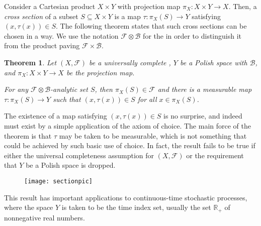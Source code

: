 \documentclass[12pt]{article}
\newtheorem*{theorem*}{Theorem}
\begin{document}

Consider a Cartesian product $X\times Y$ with projection map $\pi_X\colon X\times Y\to X$. Then, a \emph{cross section} of a subset $S\subseteq X\times Y$ is a map $\tau\colon\pi_X(S)\to Y$ satisfying $(x,\tau(x))\in S$.
The following theorem states that such cross sections can be chosen in a  way. We use the notation $\mathcal{F}\otimes\mathcal{B}$ for the  in order to distinguish it from the product paving $\mathcal{F}\times\mathcal{B}$.

\begin{theorem*}
Let $(X,\mathcal{F})$ be a universally complete , $Y$ be a Polish space with  $\mathcal{B}$, and $\pi_X\colon X\times Y\to X$ be the projection map.

For any $\mathcal{F}\otimes\mathcal{B}$-analytic set $S$, then $\pi_X(S)\in \mathcal{F}$ and there is a measurable map $\tau\colon \pi_X(S)\to Y$ such that $(x,\tau(x))\in S$ for all $x\in \pi_X(S)$.
\end{theorem*}


The existence of a map satisfying $(x,\tau(x))\in S$ is no surprise, and indeed must exist by a simple application of the axiom of choice. The main force of the theorem is that $\tau$ may be taken to be measurable, which is not something that could be achieved by such basic use of choice.
In fact, the result fails to be true if either the universal completeness assumption for $(X,\mathcal{F})$ or the requirement that $Y$ be a Polish space is dropped.

\begin{figure}[H]
\centering
\texttt{[image: sectionpic]}
\end{figure}

This result has important applications to continuous-time stochastic processes, where the space $Y$ is taken to be the time index set, usually the set $\mathbb{R}_+$ of nonnegative real numbers.
\end{document}
